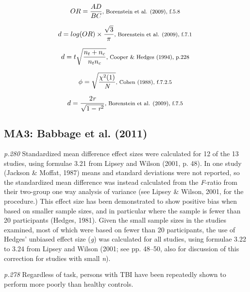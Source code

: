 \documentclass{article}
\begin{document}
\begin{equation*}
OR={\frac {AD}{BC}} \mbox{\footnotesize, Borenstein et al. (2009), f.5.8 }
\end{equation*}

\begin{equation*}
d=log(OR) \times {\frac {\sqrt{3}}{\pi}} \mbox{\footnotesize, Borenstein et al. (2009), f.7.1 }
\end{equation*}

\begin{equation*}
d = {t {\sqrt {\frac {n_{t} + n_{c}}{n_{t}n_{c}}}}} \mbox{\footnotesize, Cooper \& Hedges (1994), p.228 }
\end{equation*}

\begin{equation*}
\phi = {\sqrt {\frac {\chi ^{2}(1)}{\textit{N}}}} \mbox{\footnotesize,  Cohen (1988), f.7.2.5 } 
\end{equation*}

\begin{equation*}
d = {\frac {2 \textit{r}}{\sqrt {1 - \textit{r}^{2}}}} \mbox{\footnotesize, Borenstein et al. (2009), f.7.5 } 
\end{equation*}

\subsection*{MA3: Babbage et al. (2011)}

\textit{p.280} Standardized mean difference effect sizes were calculated for 12 of the 13 studies, using formulae 3.21 from Lipsey and Wilson (2001, p. 48). In one study (Jackson \& Moffat, 1987) means and standard deviations were not reported, so the standardized mean difference was instead calculated from the \textit{F}-ratio from their two-group one way analysis of variance (see Lipsey \& Wilson, 2001, for the procedure.) This effect size has been demonstrated to show positive bias when based on smaller sample sizes, and in particular where the sample is fewer than 20 participants (Hedges, 1981). Given the small sample sizes in the studies examined, most of which were based on fewer than 20 participants, the use of Hedges’ unbiased effect size (\textit{g}) was calculated for all studies, using formulae 3.22 to 3.24 from Lipsey and Wilson (2001; see pp. 48–50, also for discussion of this correction for studies with small \textit{n}).

\textit{p.278} Regardless of task, persons with TBI have been repeatedly shown to perform more poorly than healthy controls.
\end{document}
